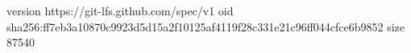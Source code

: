 version https://git-lfs.github.com/spec/v1
oid sha256:ff7eb3a10870c9923d5d15a2f10125af4119f28c331e21c96ff044cfce6b9852
size 87540
